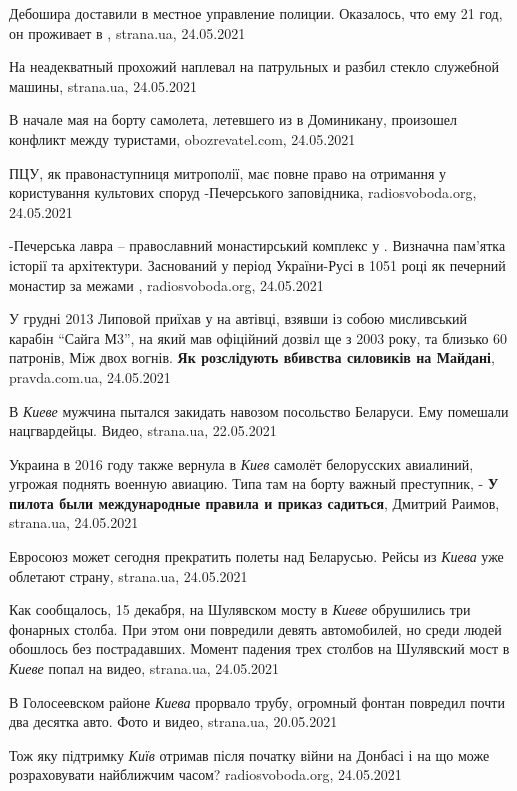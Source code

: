 Дебошира доставили в местное управление полиции. Оказалось, что ему 21 год, он
проживает в , strana.ua, 24.05.2021

На  неадекватный прохожий наплевал на патрульных и разбил
стекло служебной машины, strana.ua, 24.05.2021

В начале мая на борту самолета, летевшего из  в Доминикану,
произошел конфликт между туристами, obozrevatel.com, 24.05.2021

ПЦУ, як правонаступниця  митрополії, має повне право на отримання у
користування культових споруд -Печерського заповідника, radiosvoboda.org, 24.05.2021

-Печерська лавра – православний монастирський комплекс у . Визначна
пам’ятка історії та архітектури. Заснований у період України-Русі в 1051 році
як печерний монастир за межами , radiosvoboda.org, 24.05.2021

У грудні 2013 Липовой приїхав у  на автівці, взявши із собою
мисливський карабін \enquote{Сайга М3}, на який мав офіційний дозвіл ще з 2003
року, та близько 60 патронів, Між двох вогнів. \textbf{Як розслідують вбивства
силовиків на Майдані}, pravda.com.ua, 24.05.2021

В \emph{Киеве} мужчина пытался закидать навозом посольство Беларуси. Ему
помешали нацгвардейцы. Видео, strana.ua, 22.05.2021

Украина в 2016 году также вернула в \emph{Киев} самолёт белорусских авиалиний,
угрожая поднять военную авиацию. Типа там на борту важный преступник, -
\textbf{У пилота были международные правила и приказ садиться}, Дмитрий Раимов,
strana.ua, 24.05.2021

Евросоюз может сегодня прекратить полеты над Беларусью. Рейсы из \emph{Киева} уже
облетают страну, strana.ua, 24.05.2021

Как сообщалось, 15 декабря, на Шулявском мосту в \emph{Киеве} обрушились три фонарных
столба. При этом они повредили девять автомобилей, но среди людей обошлось без
пострадавших. Момент падения трех столбов на Шулявский мост в \emph{Киеве} попал на
видео, strana.ua, 24.05.2021

В Голосеевском районе \emph{Киева} прорвало трубу, огромный фонтан повредил
почти два десятка авто. Фото и видео, strana.ua, 20.05.2021

Тож яку підтримку \emph{Київ} отримав після початку війни на Донбасі і на що
може розраховувати найближчим часом? 
radiosvoboda.org, 24.05.2021

